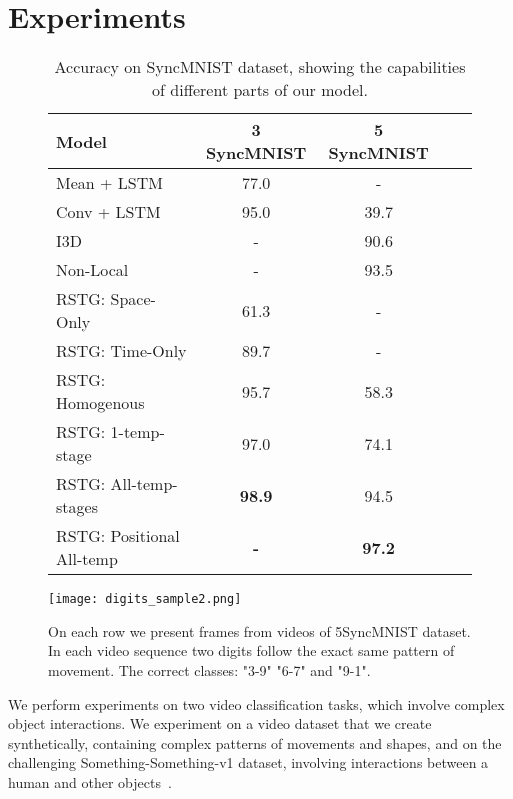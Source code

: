 \documentclass{article}
\begin{document}
\section{Experiments}

\begin{figure}
    \begin{minipage}{.65\textwidth}
    \begin{table}[H]
    \label{tab:results_digits}
    \fontsize{9}{10}\selectfont
\caption{Accuracy on SyncMNIST dataset, showing the capabilities of different parts of our model. }
       \begin{tabular}{lcccr}
            \toprule
            Model & 3 SyncMNIST  & 5 SyncMNIST & \\
            \midrule
            \midrule
            Mean + LSTM    &  77.0 & - \\
            Conv + LSTM  &  95.0 & 39.7 \\
            I3D & - & 90.6 \\
            Non-Local & - & 93.5 \\
            \midrule
            RSTG: Space-Only & 61.3 & - \\
            RSTG: Time-Only & 89.7 & - \\
            RSTG: Homogenous & 95.7 & 58.3\\
            RSTG: 1-temp-stage    & 97.0 & 74.1\\
            RSTG: All-temp-stages & \textbf{98.9} & 94.5 \\
            RSTG: Positional All-temp & \textbf{-} & \textbf{97.2} \\
            \bottomrule
        \end{tabular}
            \end{table}
    \end{minipage}
    \begin{minipage}{.35\textwidth}
        \centering
        \vspace{3mm}
        \texttt{[image: digits\_sample2.png]}
        
        \caption{On each row we present frames from videos of 5SyncMNIST dataset. In each video sequence two digits follow the exact same pattern of movement. The correct classes: "3-9" "6-7" and "9-1".}\label{fig:digits}
    \end{minipage} 
\end{figure}

We perform experiments on two video classification tasks, which involve complex object interactions. We experiment on a video dataset that we create synthetically, containing complex patterns of movements and shapes, and on the challenging Something-Something-v1 dataset, involving interactions between a human and other objects~\cite{goyal2017something}. 
\end{document}

